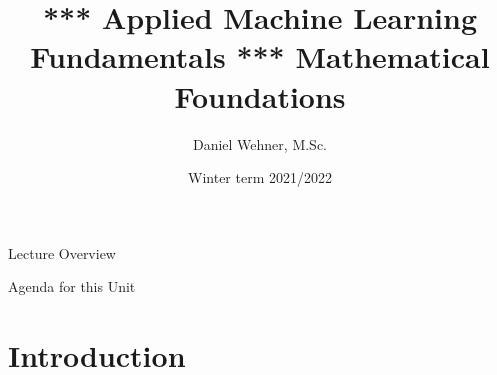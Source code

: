 


\title[Mathematical Foundations]{*** Applied Machine Learning Fundamentals *** Mathematical Foundations}
\author{Daniel Wehner, M.Sc.}
\date{Winter term 2021/2022}




\maketitlepage


\begin{frame}{Lecture Overview}{}
\end{frame}


\begin{frame}{Agenda for this Unit}
	\begin{multicols}{2}
		\tableofcontents
	\end{multicols}
\end{frame}


\section{Introduction}

